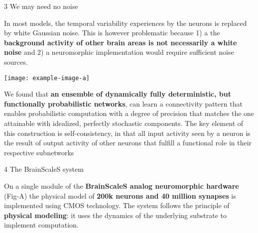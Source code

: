 \begin{frame}
\begin{columns}
\begin{column}{0.99\textwidth}
\begin{columns}[t]
\begin{column}{0.32\textwidth}
					\begin{block}{\large 3 We may need no noise}
					\blockSpaceOne

					\begin{adjustwidth}{1.cm}{1.cm}
					\justifying
					In most models, the temporal variability experiences by the neurons is replaced by white Gaussian noise.
					This is however problematic because 1) a the \textbf{background activity of other brain areas is not necessarily a white noise} and 2) a neuromorphic implementation would require sufficient noise sources. 
					\end{adjustwidth}

					\secondBlockImSpace
					\begin{center}
						\texttt{[image: example-image-a]}
					\end{center}
					\secondBlockImSpace

					\begin{adjustwidth}{1.cm}{1.cm}
					\justifying

					We  found \cite{dold2019stochasticity} that  \textbf{an  ensemble  of  dynamically  fully  deterministic,  but functionally probabilistic networks}, can learn a connectivity pattern that enables probabilistic computation with a degree of precision that matches the one attainable with idealized,  perfectly  stochastic  components.
					The  key  element  of  this  construction  is  self-consistency,  in  that  all input activity seen by a neuron is the result of output activity of other neurons that fulfill a functional role in their respective subnetworks
					
					\end{adjustwidth}

					\blockSpaceOne
					\end{block}

					\interBlockSpaceOne

					
				\begin{block}{\large 4 The BrainScaleS system}
					\blockSpaceOne


					\justifying
					\begin{adjustwidth}{1.cm}{1.cm}
					 On a single module of the \textbf{BrainScaleS \cite{schemmel2010wafer} analog neuromorphic hardware} (Fig-A) the physical model of \textbf{200k neurons and 40 million synapses} is implemented using CMOS technology.
					 The system follows the principle of \textbf{physical modeling}: it uses the dynamics of the underlying substrate to implement computation.
					 

\end{adjustwidth}
\end{block}
\end{column}
\end{columns}
\end{column}
\end{columns}
\end{frame}
